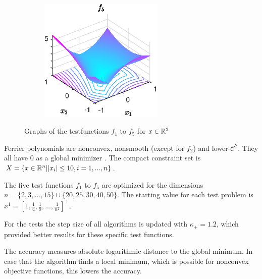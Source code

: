 \begin{figure}[ht]
\begin{subfigure}{0.47\textwidth}
		\vfil
	\end{subfigure}
	\begin{subfigure}{0.49\textwidth}
		\includegraphics[width=0.65\textwidth]{Pictures/Plots/testfun_f5}
	\end{subfigure}
	\caption[Ferrier polynomials]{Graphs of the testfunctions $f_1$ to $f_5$ for $x\in\mathbb{R}^2$}
	\label{fig_ferr_pol}
\end{figure}

Ferrier polynomials are nonconvex, nonsmooth (except for \(f_2\)) and lower-\(\mathcal{C}^2\). They all have \(0\) as a global minimizer \cite[p. 23]{Hare2016}. The compact constraint set is \(X=\{x \in \mathbb{R}^n|\lvert x_i\rvert \leq 10, i = 1,...,n \}\).

The five test functions \(f_1\) to \(f_5\) are optimized for the dimensions \(n=\{2,3,...,15\} \cup \{20,25,30,40,50\}\).
The starting value for each test problem is \(x^1=[1,\frac{1}{4},\frac{1}{9},...,\frac{1}{n^2}]^{\top}\).

For the tests the step size of all algorithms is updated with \(\kappa_+ = 1.2\), which provided better results for these specific test functions.

The accuracy measures absolute logarithmic distance to the global minimum. In case that the algorithm finds a local minimum, which is possible for nonconvex objective functions, this lowers the accuracy.


